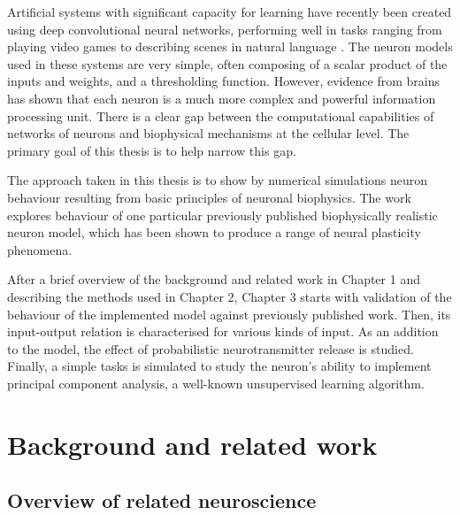 \documentclass[a4paper,12pt]{report}
\theoremstyle{definition}
\begin{document}
Artificial systems with significant capacity for learning have recently been created using deep convolutional neural networks, performing well in tasks ranging from playing video games \cite{mnih2015human} to describing scenes in natural language \cite{karpathy2014deep}. The neuron models used in these systems are very simple, often composing of a scalar product of the inputs and weights, and a thresholding function. However, evidence from brains has shown that each neuron is a much more complex and powerful information processing unit. There is a clear gap between the computational capabilities of networks of neurons and biophysical mechanisms at the cellular level. The primary goal of this thesis is to help narrow this gap.

The approach taken in this thesis is to show by numerical simulations neuron behaviour resulting from basic principles of neuronal biophysics. The work explores behaviour of one particular previously published biophysically realistic neuron model, which has been shown to produce a range of neural plasticity phenomena. 

After a brief overview of the background and related work in Chapter 1 and describing the methods used in Chapter 2, Chapter 3 starts with validation of the behaviour of the implemented model against previously published work. Then, its input-output relation is characterised for various kinds of input. As an addition to the model, the effect of probabilistic neurotransmitter release is studied. Finally, a simple tasks is simulated to study the neuron's ability to implement principal component analysis, a well-known unsupervised learning algorithm.



\chapter{Background and related work}


\section{Overview of related neuroscience}
\end{document}
